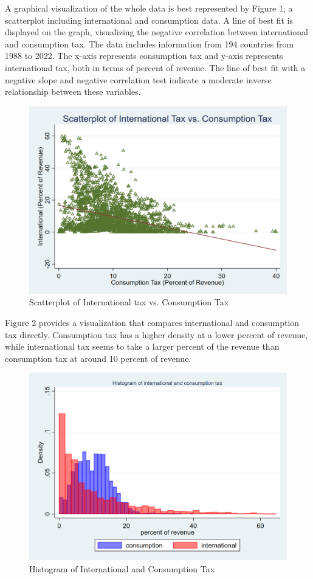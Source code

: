 \documentclass[12pt]{article}
\begin{document}
A graphical visualization of the whole data is best represented by Figure 1; a scatterplot including international and consumption data. A line of best fit is displayed on the graph, visualizing the negative correlation between international and consumption tax. The data includes information from 194 countries from 1988 to 2022. The x-axis represents consumption tax and y-axis represents international tax, both in terms of percent of revenue. The line of best fit with a negative slope and negative correlation test indicate a moderate inverse relationship between these variables. 

\begin{figure}[h]
    \centering
    \includegraphics[width=0.5\linewidth]{Reproducibility_Package//png_files/Scatterplotintvscons.png}
    \caption{Scatterplot of International tax vs. Consumption Tax}
    \label{fig:enter-label}
\end{figure}

Figure 2 provides a visualization that compares international and consumption tax directly. Consumption tax has a higher density at a lower percent of revenue, while international tax seems to take a larger percent of the revenue than consumption tax at around 10 percent of revenue. 

\begin{figure}[h]
    \centering
    \includegraphics[width=0.5\linewidth]{Reproducibility_Package//png_files/twowayhistintcons.png}
    \caption{Histogram of International and Consumption Tax}
    \label{fig:enter-label}
\end{figure}
\end{document}
